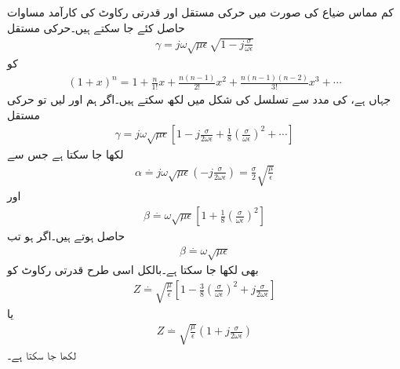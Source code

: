 کم مماس ضیاع کی صورت میں حرکی مستقل اور قدرتی رکاوٹ کی کارآمد مساوات حاصل کئے جا سکتے ہیں۔حرکی مستقل
\begin{align*}
\gamma = j \omega \sqrt{\mu \epsilon}\sqrt{1-j \frac{\sigma}{\omega \epsilon}}
\end{align*}
کو 
\begin{align*}
(1+x)^n=1+\frac{n}{1!}x+\frac{n(n-1)}{2!}x^2+\frac{n(n-1)(n-2)}{3!}x^3+\cdots
\end{align*}
جہاں  ہے، کی مدد سے  تسلسل کی شکل میں لکھ سکتے ہیں۔اگر ہم  اور  لیں تو حرکی مستقل 
\begin{align*}
\gamma=j \omega \sqrt{\mu \epsilon} \left[1-j\frac{\sigma}{2\omega \epsilon}+\frac{1}{8}\left(\frac{\sigma}{\omega \epsilon}\right)^2+\cdots \right]
\end{align*}
 لکھا جا سکتا ہے جس سے
\begin{align}\label{مساوات_موج_تضعیفی_سادہ}
\alpha \overset{.}{=} j \omega \sqrt{\mu \epsilon} \left(-j\frac{\sigma}{2\omega \epsilon} \right)=\frac{\sigma}{2}\sqrt{\frac{\mu}{\epsilon}}
\end{align}
اور 
\begin{align}\label{مساوات_موج_زاویائی_سادہ_الف}
\beta \overset{.}{=}\omega \sqrt{\mu \epsilon}\left[1+\frac{1}{8}\left(\frac{\sigma}{\omega \epsilon}\right)^2 \right]
\end{align}
حاصل ہوتے ہیں۔اگر  ہو تب
\begin{align}\label{مساوات_موج_زاویائی_سادہ_ب}
\beta \overset{.}{=}\omega \sqrt{\mu \epsilon}
\end{align}
بھی لکھا جا سکتا ہے۔بالکل اسی طرح قدرتی رکاوٹ کو
\begin{align}\label{مساوات_موج_رکاوٹ_سادہ_الف}
Z \overset{.}{=} \sqrt{\frac{\mu}{\epsilon}} \left[1-\frac{3}{8}\left(\frac{\sigma}{\omega \epsilon}\right)^2 +j \frac{\sigma}{2\omega \epsilon}\right]
\end{align}
یا
\begin{align}\label{مساوات_موج_رکاوٹ_سادہ_ب}
Z \overset{.}{=} \sqrt{\frac{\mu}{\epsilon}} \left(1 +j \frac{\sigma}{2\omega \epsilon}\right)
\end{align}
لکھا جا سکتا ہے۔

